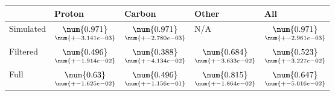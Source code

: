 \begin{tabular}{lllll}
\toprule
{} &                                              Proton &                                              Carbon &                                               Other &                                                 All \\
\midrule
Simulated &  $\underset{\num{+- 3.141e-03 }  }{\num{ 0.971 } }$ &  $\underset{\num{+- 2.780e-03 }  }{\num{ 0.971 } }$ &  N/A &  $\underset{\num{+- 2.961e-03 }  }{\num{ 0.971 } }$ \\
Filtered  &  $\underset{\num{+- 1.914e-02 }  }{\num{ 0.496 } }$ &  $\underset{\num{+- 4.134e-02 }  }{\num{ 0.388 } }$ &  $\underset{\num{+- 3.633e-02 }  }{\num{ 0.684 } }$ &  $\underset{\num{+- 3.227e-02 }  }{\num{ 0.523 } }$ \\
Full      &  $\underset{\num{+- 1.625e-02 }  }{\num{ 0.63 } }$ &  $\underset{\num{+- 1.156e-01 }  }{\num{ 0.496 } }$ &  $\underset{\num{+- 1.864e-02 }  }{\num{ 0.815 } }$ &  $\underset{\num{+- 5.016e-02 }  }{\num{ 0.647 } }$ \\
\bottomrule
\end{tabular}
